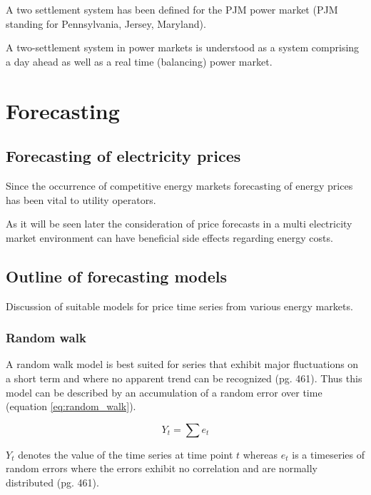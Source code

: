A two settlement system has been defined for the PJM power market (PJM standing for Pennsylvania, Jersey, Maryland)\cite{lambert2001creating}. 

A two-settlement system in power markets is understood as a system comprising a day ahead as well as a real time (balancing) power market\cite{lambert2001creating}. 




\section{Forecasting}

\subsection{Forecasting of electricity prices}

Since the occurrence of competitive energy markets forecasting of energy prices has been vital to utility operators. 

As it will be seen later the consideration of price forecasts in a multi electricity market environment can have beneficial side effects regarding energy costs. 



\subsection{Outline of forecasting models}

Discussion of suitable models for price time series from various energy markets. 


\subsubsection{Random walk}

A random walk model is best suited for series that exhibit major fluctuations on a short term and where no apparent trend can be recognized \cite{makridakisforecasting}(pg. 461). Thus this model can be described by an accumulation of a random error over time (equation \ref{eq:random_walk}). 

\begin{equation}
Y_t = \sum e_t
\label{eq:random_walk}
\end{equation}

$Y_t$ denotes the value of the time series at time point $t$ whereas $e_t$ is a timeseries of random errors where the errors exhibit no correlation and are normally distributed \cite{makridakisforecasting}(pg. 461). 

